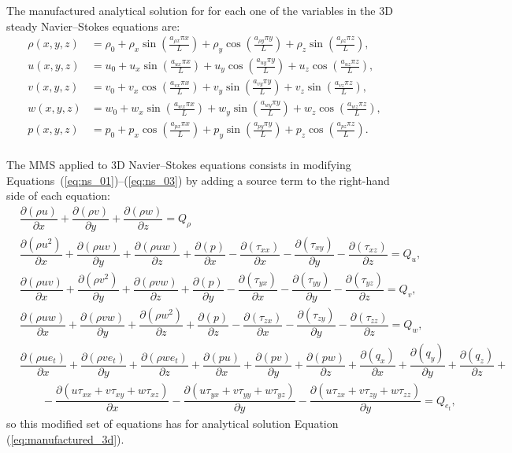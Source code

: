 \documentclass[10pt]{article}
\newcommand{\Diff}[2] {\dfrac{\partial( #1)}{\partial #2}}
\begin{document}
The manufactured analytical solution for for each one of the variables in the 3D steady Navier--Stokes equations are:
\begin{equation}
\begin{split}
\label{eq:manufactured_3d}
\rho\left( x ,y ,z\right) &=  \rho_{0}+ \rho_{x} \sin\left(\frac{a_{ \rho  x} \pi x}{L}\right)+ \rho_{y} \cos\left(\frac{a_{ \rho  y} \pi y}{L}\right) + \rho_{z} \sin\left(\frac{a_{ \rho  z} \pi z}{L}\right) ,\\
u\left( x ,y ,z\right) &= u_{0}+u_{x} \sin\left(\frac{a_{u  x} \pi x}{L}\right)+u_{y} \cos\left(\frac{a_{u  y} \pi y}{L}\right)+u_{z} \cos\left(\frac{a_{u  z} \pi z}{L}\right) ,\\
v\left( x ,y ,z\right) &= v_{0}+v_{x} \cos\left(\frac{a_{v  x} \pi x}{L}\right)+v_{y} \sin\left(\frac{a_{v  y} \pi y}{L}\right)+v_{z} \sin\left(\frac{a_{v  z} \pi z}{L}\right), \\
w\left( x ,y ,z\right) &= w_{0}+w_{x} \sin\left(\frac{a_{w  x} \pi x}{L}\right)+w_{y} \sin\left(\frac{a_{w  y} \pi y}{L}\right)+ w_{z} \cos\left(\frac{a_{w  z} \pi z}{L}\right) ,\\
p\left( x ,y ,z\right) &= p_{0}+p_{x} \cos\left(\frac{a_{p  x} \pi x}{L}\right)+p_{y} \sin\left(\frac{a_{p  y} \pi y}{L}\right)+ p_{z} \cos\left(\frac{a_{p  z} \pi z}{L}\right).\\
\end{split}
\end{equation}


The MMS applied to 3D Navier--Stokes equations consists in modifying Equations~(\ref{eq:ns_01})--(\ref{eq:ns_03}) by adding a source term to the right-hand side of each equation:
\begin{equation}
\begin{split}
\label{eq:ns_3d_mod}
&\Diff{\rho u}{x}+\Diff{\rho v}{y} + \Diff{\rho w}{z} = Q_\rho\\
%
 &\Diff{\rho u^2 }{x}+\Diff{\rho uv}{y} +\Diff{\rho uw}{z} +\Diff{p}{x}-\Diff{\tau_{xx}}{x}-\Diff{\tau_{xy}}{y}-\Diff{\tau_{xz}}{z}= Q_u,\\
%
&\Diff{\rho uv }{x}+\Diff{\rho v^2}{y} +\Diff{\rho vw}{z}+\Diff{p}{y}-\Diff{\tau_{yx}}{x}-\Diff{\tau_{yy}}{y}-\Diff{\tau_{yz}}{z}= Q_v,\\
%
&\Diff{\rho uw }{ x}+\Diff{\rho  vw }{ y}+\Diff{\rho w^2 }{ z}+\Diff{p}{z}-\Diff{\tau_{zx}}{x}-\Diff{\tau_{zy}}{y}-\Diff{\tau_{zz}}{z}=Q_w,\\
%
&\Diff{\rho u e_t}{x}+\Diff{\rho v e_t}{y}+\Diff{\rho we_t}{z}+\Diff{pu}{x}+\Diff{pv}{y}+\Diff{pw}{z} +\Diff{q_x}{x} +\Diff{q_y}{y} +\Diff{q_z}{z}+\\
    &\qquad-\Diff{u\tau_{xx}+v\tau_{xy}+w\tau_{xz}}{x}-\Diff{u\tau_{yx}+v\tau_{yy}+w\tau_{yz}}{y}-\Diff{u\tau_{zx}+v\tau_{zy}+w\tau_{zz}}{y}=Q_{e_t},
\end{split}
\end{equation}
so this modified set of equations has for analytical solution Equation (\ref{eq:manufactured_3d}).
\end{document}
